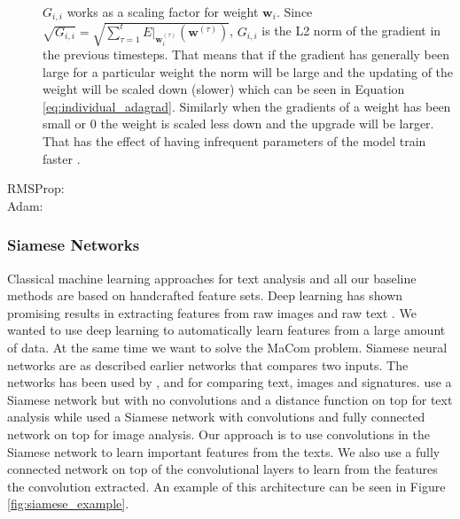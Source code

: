 \begin{description}
        $G_{i,i}$ works as a scaling factor for weight
        $\mathbf{w}_i$. Since $\sqrt{G_{i,i}} = \sqrt{\sum_{\tau=1}^t
        E|_{\mathbf{w}^{(\tau)}_i}\left(\mathbf{w}^{(\tau)}\right)}$,
        $G_{i,i}$ is the L2 norm of the gradient in the previous timesteps.
        That means that if the gradient has generally been large for a
        particular weight the norm will be large and the updating of the
        weight will be scaled down (slower) which can be seen in Equation
        \eqref{eq:individual_adagrad}. Similarly when the gradients of a weight
        has been small or 0 the weight is scaled less down and the upgrade will
        be larger. That has the effect of having infrequent parameters of the
        model train faster \cite{Duchi:2011:ASM:1953048.2021068}.

    \item[\gls{RMSProp}:]


    \item[\gls{Adam}:]


\end{description}


\subsubsection{Siamese Networks}

Classical machine learning approaches for text analysis and all our baseline
methods are based on handcrafted feature sets. Deep learning has shown
promising results in extracting features from raw images and raw text
\cite{hongxiaosunyuan}. We wanted to use deep learning to automatically learn
features from a large amount of data. At the same time we want to solve the
MaCom problem. Siamese neural networks are as described earlier networks that
compares two inputs. The networks has been used by \cite{Koch2015SiameseNN},
\cite{NIPS1993_769} and \cite{qian:2018} for comparing text, images and
signatures. \cite{qian:2018} use a Siamese network but with no convolutions and
a distance function on top for text analysis while \cite{Koch2015SiameseNN}
used a Siamese network with convolutions and fully connected network on top
for image analysis. Our approach is to use convolutions in the Siamese network
to learn important features from the texts. We also use a fully connected
network on top of the convolutional layers to learn from the features the
convolution extracted. An example of this architecture can be seen in Figure
\ref{fig:siamese_example}.

